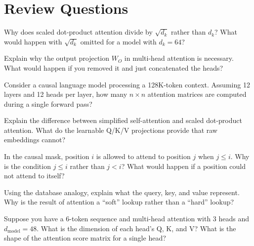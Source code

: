 \section*{Review Questions}

\begin{reviewquestion}[1]
  Why does scaled dot-product attention divide by $\sqrt{d_k}$ rather
  than $d_k$? What would happen with $\sqrt{d_k}$ omitted for a model
  with $d_k = 64$?
\end{reviewquestion}

\begin{reviewquestion}[2]
  Explain why the output projection $W_O$ in multi-head attention is
  necessary. What would happen if you removed it and just concatenated
  the heads?
\end{reviewquestion}

\begin{reviewquestion}[3]
  Consider a causal language model processing a 128K-token context.
  Assuming 12 layers and 12 heads per layer, how many $n \times n$
  attention matrices are computed during a single forward pass?
\end{reviewquestion}

\begin{reviewquestion}[4]
  Explain the difference between simplified self-attention and scaled
  dot-product attention. What do the learnable Q/K/V projections provide
  that raw embeddings cannot?
\end{reviewquestion}

\begin{reviewquestion}[5]
  In the causal mask, position $i$ is allowed to attend to position $j$
  when $j \leq i$. Why is the condition $j \leq i$ rather than $j < i$?
  What would happen if a position could not attend to itself?
\end{reviewquestion}

\begin{reviewquestion}[6]
  Using the database analogy, explain what the query, key, and value
  represent. Why is the result of attention a ``soft'' lookup rather
  than a ``hard'' lookup?
\end{reviewquestion}

\begin{reviewquestion}[7]
  Suppose you have a 6-token sequence and multi-head attention with
  3 heads and $d_{\text{model}} = 48$. What is the dimension of each
  head's Q, K, and V? What is the shape of the attention score matrix
  for a single head?
\end{reviewquestion}

